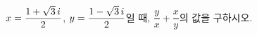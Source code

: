 $x=\dfrac{1+\sqrt{3}\mkern3mu i}{2}$, $y=\dfrac{1-\sqrt{3}\mkern3mu i}{2}$일 때, $\dfrac{y}{x}+\dfrac{x}{y}$의 값을 구하시오.
